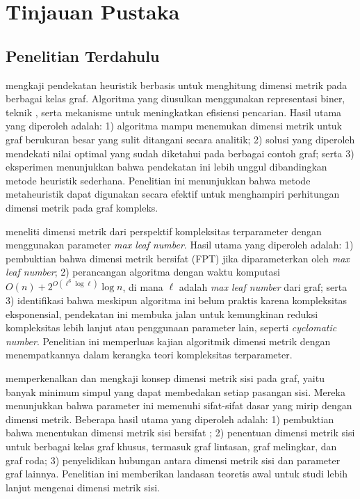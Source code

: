 \chapter{Tinjauan Pustaka}

\section{Penelitian Terdahulu}

\cite{kratica2007} mengkaji pendekatan heuristik berbasis  untuk menghitung dimensi metrik pada berbagai kelas graf. Algoritma yang diusulkan menggunakan representasi biner, teknik , serta mekanisme  untuk meningkatkan efisiensi pencarian. Hasil utama yang diperoleh adalah: 1) algoritma mampu menemukan dimensi metrik untuk graf berukuran besar yang sulit ditangani secara analitik; 2) solusi yang diperoleh mendekati nilai optimal yang sudah diketahui pada berbagai contoh graf; serta 3) eksperimen menunjukkan bahwa pendekatan ini lebih unggul dibandingkan metode heuristik sederhana. Penelitian ini menunjukkan bahwa metode metaheuristik dapat digunakan secara efektif untuk menghampiri perhitungan dimensi metrik pada graf kompleks.

\cite{eppstein2015} meneliti dimensi metrik dari perspektif kompleksitas terparameter dengan menggunakan parameter \textit{max leaf number}. Hasil utama yang diperoleh adalah: 1) pembuktian bahwa dimensi metrik bersifat  (FPT) jika diparameterkan oleh \textit{max leaf number}; 2) perancangan algoritma dengan waktu komputasi \(O(n) + 2^{O(\ell^{6} \log \ell)} \log n\), di mana \(\ell\) adalah \textit{max leaf number} dari graf; serta 3) identifikasi bahwa meskipun algoritma ini belum praktis karena kompleksitas eksponensial, pendekatan ini membuka jalan untuk kemungkinan reduksi kompleksitas lebih lanjut atau penggunaan parameter lain, seperti \textit{cyclomatic number}. Penelitian ini memperluas kajian algoritmik dimensi metrik dengan menempatkannya dalam kerangka teori kompleksitas terparameter.

\cite{kelenc2018} memperkenalkan dan mengkaji konsep dimensi metrik sisi pada graf, yaitu banyak minimum simpul yang dapat membedakan setiap pasangan sisi. Mereka menunjukkan bahwa parameter ini memenuhi sifat-sifat dasar yang mirip dengan dimensi metrik. Beberapa hasil utama yang diperoleh adalah: 1) pembuktian bahwa menentukan dimensi metrik sisi bersifat ; 2) penentuan dimensi metrik sisi untuk berbagai kelas graf khusus, termasuk graf lintasan, graf melingkar, dan graf roda; 3) penyelidikan hubungan antara dimensi metrik sisi dan parameter graf lainnya. Penelitian ini memberikan landasan teoretis awal untuk studi lebih lanjut mengenai dimensi metrik sisi.


